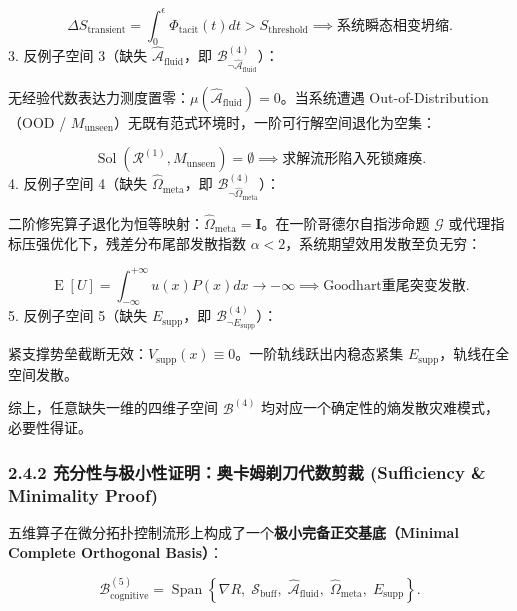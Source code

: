 \documentclass[11pt,a4paper,oneside]{ctexart}
\begin{document}
\begin{equation}
\Delta S_{\text{transient}} = \int_0^{\epsilon} \Phi_{\text{tacit}}(t) dt > S_{\text{threshold}} \implies \text{系统瞬态相变坍缩}.
\end{equation}
3. \textit{}反例子空间 3（缺失 $\hat{\mathcal{A}}_{\text{fluid}}$，即 $\mathcal{B}_{\neg \hat{\mathcal{A}}_{\text{fluid}}}^{(4)}$）\textit{}：

无经验代数表达力测度置零：$\mu(\hat{\mathcal{A}}_{\text{fluid}}) = 0$。当系统遭遇 Out-of-Distribution（OOD / $M_{\text{unseen}}$）无既有范式环境时，一阶可行解空间退化为空集：

\begin{equation}
\operatorname{Sol}(\mathcal{R}^{(1)}, M_{\text{unseen}}) = \emptyset \implies \text{求解流形陷入死锁瘫痪}.
\end{equation}
4. \textit{}反例子空间 4（缺失 $\hat{\Omega}_{\text{meta}}$，即 $\mathcal{B}_{\neg \hat{\Omega}_{\text{meta}}}^{(4)}$）\textit{}：

二阶修宪算子退化为恒等映射：$\hat{\Omega}_{\text{meta}} = \mathbf{I}$。在一阶哥德尔自指涉命题 $\mathcal{G}$ 或代理指标压强优化下，残差分布尾部发散指数 $\alpha < 2$，系统期望效用发散至负无穷：

\begin{equation}
\operatorname{E}[U] = \int_{-\infty}^{+\infty} u(x) P(x) dx \to -\infty \implies \text{Goodhart重尾突变发散}.
\end{equation}
5. \textit{}反例子空间 5（缺失 $E_{\text{supp}}$，即 $\mathcal{B}_{\neg E_{\text{supp}}}^{(4)}$）\textit{}：

紧支撑势垒截断无效：$V_{\text{supp}}(x) \equiv 0$。一阶轨线跃出内稳态紧集 $E_{\text{supp}}$，轨线在全空间发散。


综上，任意缺失一维的四维子空间 $\mathcal{B}^{(4)}$ 均对应一个确定性的熵发散灾难模式，必要性得证。


\subsubsection{2.4.2 充分性与极小性证明：奥卡姆剃刀代数剪裁 (Sufficiency \& Minimality Proof)}

五维算子在微分拓扑控制流形上构成了一个\textbf{极小完备正交基底（Minimal Complete Orthogonal Basis）}：

\begin{equation}
\mathcal{B}_{\text{cognitive}}^{(5)} = \operatorname{Span}\left\{ \nabla R, \; \mathcal{S}_{\text{buff}}, \; \hat{\mathcal{A}}_{\text{fluid}}, \; \hat{\Omega}_{\text{meta}}, \; E_{\text{supp}} \right\}.
\end{equation}
\end{document}
